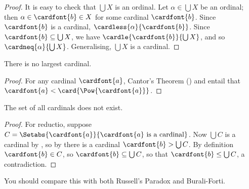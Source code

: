 \documentclass[../../../include/open-logic-section]{subfiles}
\begin{document}
\begin{proof}
It is easy to check that $\bigcup X$ is an ordinal. Let $\alpha \in
\bigcup X$ be an ordinal; then $\alpha \in \cardfont{b} \in X$ for
some cardinal $\cardfont{b}$. Since $\cardfont{b}$ is a cardinal,
$\cardless{\alpha}{\cardfont{b}}$. Since $\cardfont{b} \subseteq
\bigcup X$, we have $\cardle{\cardfont{b}}{\bigcup X}$, and so
$\cardneq{\alpha}{\bigcup X}$. Generalising, $\bigcup X$ is a
cardinal.
\end{proof} 

\begin{thm}
There is no largest cardinal.
\end{thm}

\begin{proof}
For any cardinal $\cardfont{a}$, Cantor's Theorem
() and
 entail that
$\cardfont{a} < \card{\Pow{\cardfont{a}}}$.
\end{proof}

\begin{thm}
The set of all cardinals does not exist.
\end{thm}

\begin{proof}
For reductio, suppose $C = \Setabs{\cardfont{a}}{\cardfont{a} \text{
is a cardinal}}$. Now $\bigcup C$ is a cardinal by
, so by 
there is a cardinal $\cardfont{b} > \bigcup C$. By definition
$\cardfont{b} \in C$, so $\cardfont{b} \subseteq \bigcup{C}$, so that
$\cardfont{b} \leq \bigcup C$, a contradiction.
\end{proof}

You should compare this with both Russell's Paradox and Burali-Forti. 
\end{document}
